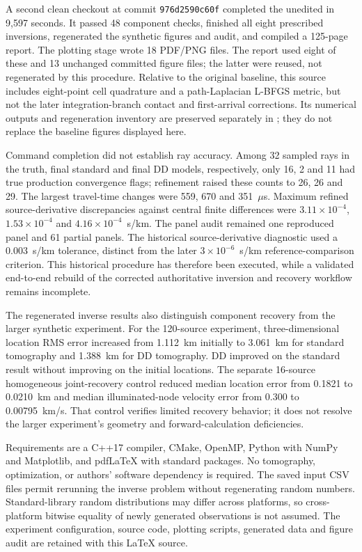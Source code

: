 \documentclass[11pt]{article}
\begin{document}
A second clean checkout at commit \texttt{976d2590c60f} completed the unedited
 in 9,597 seconds. It passed 48 component checks, finished all
eight prescribed inversions, regenerated the synthetic figures and audit, and
compiled a 125-page report. The plotting stage wrote 18 PDF/PNG files. The
report used eight of these and 13 unchanged committed figure files; the latter
were reused, not regenerated by this procedure. Relative to the original baseline, this source includes
eight-point cell quadrature and a path-Laplacian L-BFGS metric, but not the
later integration-branch contact and first-arrival corrections. Its numerical
outputs and regeneration inventory are preserved separately in
; they do not replace
the baseline figures displayed here.

Command completion did not establish ray accuracy. Among 32 sampled rays in
the truth, final standard and final DD models, respectively, only 16, 2 and
11 had true production convergence flags; refinement raised these counts to
26, 26 and 29. The largest travel-time changes were 559, 670 and
351~$\mu$s. Maximum refined source-derivative discrepancies against central
finite differences were $3.11\times10^{-4}$, $1.53\times10^{-4}$ and
$4.16\times10^{-4}$~s/km. The panel audit remained one reproduced panel and
61 partial panels. The historical source-derivative diagnostic used a
$0.003$~s/km tolerance, distinct from the later $3\times10^{-6}$~s/km
reference-comparison criterion. This historical procedure has therefore been executed,
while a validated end-to-end rebuild of the corrected authoritative inversion
and recovery workflow remains incomplete.

The regenerated inverse results also distinguish component recovery from the
larger synthetic experiment. For the 120-source experiment, three-dimensional
location RMS error increased from 1.112~km initially to 3.061~km for standard
tomography and 1.388~km for DD tomography. DD improved on the standard result
without improving on the initial locations. The separate 16-source homogeneous
joint-recovery control reduced median location error from 0.1821 to 0.0210~km
and median illuminated-node velocity error from 0.300 to 0.00795~km/s. That
control verifies limited recovery behavior; it does not resolve the larger
experiment's geometry and forward-calculation deficiencies.

Requirements are a C++17 compiler, CMake, OpenMP, Python with NumPy and
Matplotlib, and pdfLaTeX with standard packages. No tomography, optimization,
or authors' software dependency is required. The saved input CSV files
permit rerunning the inverse problem without regenerating random numbers.
Standard-library random distributions may differ across platforms, so
cross-platform bitwise equality of newly generated observations is not
assumed. The experiment configuration, source code, plotting scripts,
generated data and figure audit are retained with this LaTeX source.
\end{document}
